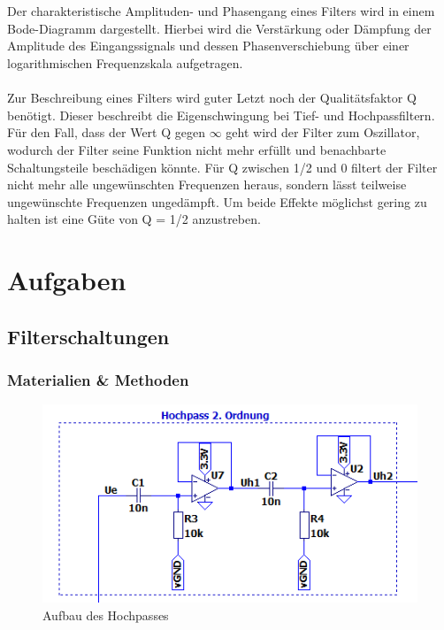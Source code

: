 \\
\\
Der charakteristische Amplituden- und Phasengang eines Filters wird in einem Bode-Diagramm dargestellt. Hierbei wird die Verstärkung oder Dämpfung der Amplitude des Eingangssignals und dessen Phasenverschiebung über einer logarithmischen Frequenzskala aufgetragen.
\\
\\
Zur Beschreibung eines Filters wird guter Letzt noch der Qualitätsfaktor Q benötigt. Dieser beschreibt die Eigenschwingung bei Tief- und Hochpassfiltern. Für den Fall, dass der Wert Q gegen $\infty$ geht wird der Filter zum Oszillator, wodurch der Filter seine Funktion nicht mehr erfüllt und benachbarte Schaltungsteile beschädigen könnte. Für Q zwischen 1/2 und 0 filtert der Filter nicht mehr alle ungewünschten Frequenzen heraus, sondern lässt teilweise ungewünschte Frequenzen ungedämpft. Um beide Effekte möglichst gering zu halten ist eine Güte von Q = 1/2 anzustreben.

\clearpage
\section{Aufgaben}

\subsection{Filterschaltungen}

\subsubsection{Materialien \& Methoden}

\begin{figure}[htb]
    \includegraphics[width=14cm]{./pictures/Hochpass}
    \caption{Aufbau des Hochpasses}
    \label{fig:Hochpass}
\end{figure}

